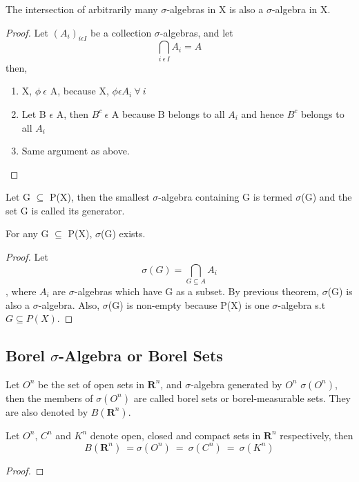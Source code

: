 \begin{theorem}
    The intersection of arbitrarily many $\sigma$-algebras in X is also a
    $\sigma$-algebra in X.
\end{theorem}
\begin{proof}
    Let $(A_i)_{i \epsilon I}$ be a collection $\sigma$-algebras, and let
    \[
        \bigcap_{i \: \epsilon \: I}A_i = A
    \]
    then,
    \begin{enumerate}
        \item X, $\phi \: \epsilon$ A, because X, $\phi \epsilon A_i \: \forall
        \: i$
        \item Let B $\epsilon$ A, then $B^c \: \epsilon$ A because B belongs to
            all $A_i$ and hence $B^c$ belongs to all $A_i$
        \item Same argument as above.
    \end{enumerate}
\end{proof}
\begin{definition}
    Let G $\subseteq$ P(X), then the smallest $\sigma$-algebra containing G is
    termed $\sigma$(G) and the set G is called its generator.
\end{definition}
\begin{theorem}
    For any G $\subseteq$ P(X), $\sigma$(G) exists.
\end{theorem}
\begin{proof}
    Let 
    \[
        \sigma(G) = \bigcap_{G \subseteq A} A_i
    \]
    , where $A_i$ are $\sigma$-algebras which have G as a subset. By previous
    theorem, $\sigma$(G) is also a $\sigma$-algebra. Also, $\sigma$(G) is
    non-empty because P(X) is one $\sigma$-algebra s.t $G \subseteq P(X)$.
\end{proof}

\subsection{Borel $\sigma$-Algebra or Borel Sets}
\begin{definition}
    Let $O^n$ be the set of open sets in $\bm{R}^n$, and  $\sigma$-algebra
    generated by $O^n$ $\sigma(O^n)$, then the members of $\sigma(O^n)$ are
    called borel sets or borel-measurable sets. They are also denoted by
    $B(\bm{R}^n)$.
\end{definition}
\begin{theorem}
    Let $O^n$, $C^n$ and $K^n$ denote open, closed and compact sets in
    $\bm{R}^n$ respectively, then
    \[
        B(\bm{R}^n) \: = \sigma(O^n) \: = \: \sigma(C^n) \: = \: \sigma(K^n)
    \]
\end{theorem}
\begin{proof}
\end{proof}

